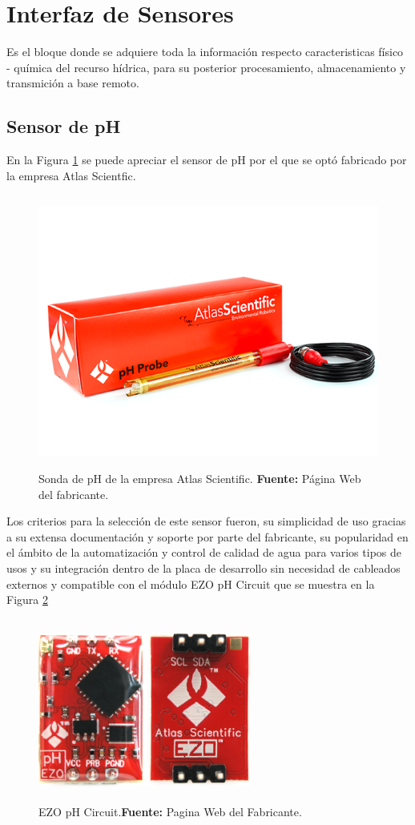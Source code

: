 \section[Interfaz de Sensores]{Interfaz de Sensores}
Es el bloque donde se adquiere toda la información respecto caracteristicas f\'isico - qu\'imica del recurso h\'idrica, para su posterior procesamiento, almacenamiento y transmici\'on a base remoto.

\subsection{Sensor de pH}
En la Figura \ref{fig:4.8} se puede apreciar el sensor de pH por el que se optó fabricado por la empresa Atlas Scientfic.
    \begin{figure}[t]
    \centering
	\includegraphics[width=150mm, height=90mm]{Imagenes/2021/imag23.png}%
	\caption[Sonda de pH de la empresa Atlas Scientific]{Sonda de pH de la empresa Atlas Scientific. \textbf{Fuente:} Página Web del fabricante.}
	\label{fig:4.8}
    \end{figure}
Los criterios para la selección de este sensor fueron, su simplicidad de uso gracias a su extensa documentación y soporte por parte del fabricante, su popularidad en el ámbito de la automatización y control de calidad de agua para varios tipos de usos y su integración dentro de la placa de desarrollo sin necesidad de cableados externos y compatible con el módulo EZO pH Circuit que se muestra en la Figura \ref{fig:4.9}
\newline
\hfill
    \begin{figure}[H]
    \centering
	\includegraphics[width=70mm, height=60mm]{Imagenes/2021/imag27.png}%
	\caption[EZO pH Circuit]{EZO pH Circuit.\textbf{Fuente:} Pagina Web del Fabricante.}
	\label{fig:4.9}
    \end{figure}
